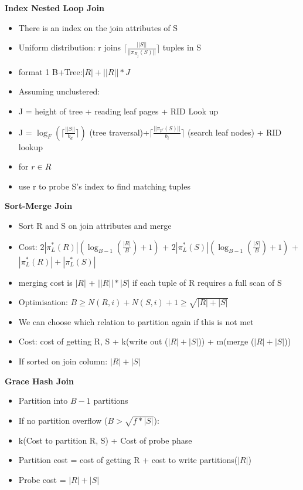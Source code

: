 \documentclass[10pt, landscape]{article}
\newcommand{\ceil}[1]{\lceil #1 \rceil}
\begin{document}
\begin{multicols}{4}
      \textbf{Index Nested Loop Join} \newline
      \begin{itemize}
        \item There is an index on the join attributes of S
        \item Uniform distribution: r joins $\ceil{\frac{||S||}{||\pi_{B_j}(S)||}}$ tuples in S
        \item format 1 B+Tree:$|R| + ||R|| * J$
        \item Assuming unclustered:
        \item J = height of tree + reading leaf pages + RID Look up
        \item J = $\log_F(\ceil{\frac{||S||}{b_d}})$ (tree traversal)+$\ceil{\frac{||\pi_{p'}(S)||}{b_i}}$ (search leaf nodes) + RID lookup
        \item for $r \in R$ 
        \item use r to probe S's index to find matching tuples
      \end{itemize}

      \textbf{Sort-Merge Join} \newline
      \begin{itemize}
        \item Sort R and S on join attributes and merge
        \item Cost: $2|\pi^*_L(R)|(\log_{B-1}(\frac{|R|}{B})+1)$ + $2|\pi^*_L(S)|(\log_{B-1}(\frac{|S|}{B})+1)$ + $|\pi^*_L(R)|+|\pi^*_L(S)|$
        \item merging cost is $|R|$ + $||R||*|S|$ if each tuple of R requires a full scan of S
        \item Optimisation: $B \ge N(R,i) + N(S,i) + 1 \ge \sqrt{|R|+|S|}$ 
        \item We can choose which relation to partition again if this is not met
        \item Cost: cost of getting R, S + k(write out ($|R|+|S|$)) + m(merge ($|R|+|S|$))
        \item If sorted on join column: $|R|+|S|$
      \end{itemize}

      \textbf{Grace Hash Join} \newline
      \begin{itemize}
        \item Partition into $B-1$ partitions
        \item If no partition overflow ($B > \sqrt{f*|S|}$):
        \item k(Cost to partition R, S) + Cost of probe phase
        \item Partition cost = cost of getting R + cost to write partitions($|R|$)
        \item Probe cost = $|R| + |S|$
      \end{itemize}


\end{multicols}
\end{document}
